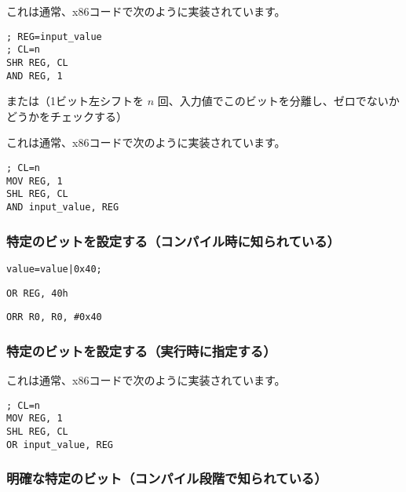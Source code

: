 これは通常、x86コードで次のように実装されています。

\begin{lstlisting}[caption=x86,style=customasmx86]
; REG=input_value
; CL=n
SHR REG, CL
AND REG, 1
\end{lstlisting}

または（1ビット左シフトを $n$ 回、入力値でこのビットを分離し、ゼロでないかどうかをチェックする）



これは通常、x86コードで次のように実装されています。

\begin{lstlisting}[caption=x86,style=customasmx86]
; CL=n
MOV REG, 1
SHL REG, CL
AND input_value, REG
\end{lstlisting}

\subsubsection{特定のビットを設定する（コンパイル時に知られている）}

\begin{lstlisting}[caption=\CCpp]
value=value|0x40;
\end{lstlisting}

\begin{lstlisting}[caption=x86,style=customasmx86]
OR REG, 40h
\end{lstlisting}

\begin{lstlisting}[caption=ARM (\ARMMode) and ARM64,style=customasmARM]
ORR R0, R0, #0x40
\end{lstlisting}

\subsubsection{特定のビットを設定する（実行時に指定する）}



これは通常、x86コードで次のように実装されています。

\begin{lstlisting}[caption=x86,style=customasmx86]
; CL=n
MOV REG, 1
SHL REG, CL
OR input_value, REG
\end{lstlisting}

\subsubsection{明確な特定のビット（コンパイル段階で知られている）}

